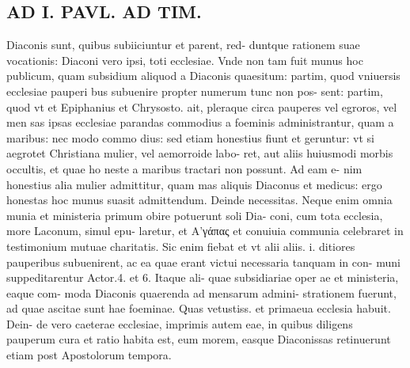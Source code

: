 \documentclass{article}
\begin{document}
\begin{pages}
\section*{AD I. PAVL. AD TIM. }
\marginpar{[ p.272 ]}\pstart Diaconis sunt, quibus subiiciuntur et parent, red- duntque rationem suae vocationis: Diaconi vero ipsi, toti ecclesiae. Vnde non tam fuit munus hoc publicum, quam subsidium aliquod a Diaconis quaesitum: partim, quod vniuersis ecclesiae pauperi bus subuenire propter numerum tunc non pos- sent: partim, quod vt et Epiphanius et Chrysosto. ait, pleraque circa pauperes vel egroros, vel men sas ipsas ecclesiae parandas commodius a foeminis administrantur, quam a maribus: nec modo commo dius: sed etiam honestius fiunt et geruntur: vt si aegrotet Christiana mulier, vel aemorroide labo- ret, aut aliis huiusmodi morbis occultis, et quae ho neste a maribus tractari non possunt. Ad eam e- nim honestius alia mulier admittitur, quam mas aliquis Diaconus et medicus: ergo honestas hoc munus suasit admittendum. Deinde necessitas. Neque enim omnia munia et ministeria primum obire potuerunt soli Dia- coni, cum tota ecclesia, more Laconum, simul epu- laretur, et Α’γάπας et conuiuia communia celebraret in testimonium mutuae charitatis. Sic enim fiebat et vt alii aliis. i. ditiores pauperibus subuenirent, ac ea quae erant victui necessaria tanquam in con- muni suppeditarentur Actor.4. et 6. Itaque ali- quae subsidiariae oper ae et ministeria, eaque com- moda Diaconis quaerenda ad mensarum admini- strationem fuerunt, ad quae ascitae sunt hae foeminae. Quas vetustiss. et primaeua ecclesia habuit. Dein- de vero caeterae ecclesiae, imprimis autem eae, in quibus diligens pauperum cura et ratio habita est, eum morem, easque Diaconissas retinuerunt etiam post Apostolorum tempora.  \pend

\end{pages}
\end{document}
